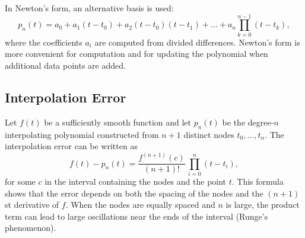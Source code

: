 \documentclass[12pt]{article}
\begin{document}
In Newton's form, an alternative basis is used:
\begin{equation}
p_n(t) =
a_0 + a_1 (t - t_0) + a_2 (t - t_0)(t - t_1) + \dots +
a_n \prod_{k=0}^{n-1} (t - t_k),
\label{eq:newton_poly}
\end{equation}
where the coefficients $a_i$ are computed from divided differences. Newton's form is more convenient for computation and for updating the
polynomial when additional data points are added.

\subsection{Interpolation Error}
Let $f(t)$ be a sufficiently smooth function and let $p_n(t)$ be the
degree-$n$ interpolating polynomial constructed from $n+1$ distinct
nodes $t_0,\dots,t_n$. The interpolation error can be written as
\begin{equation}
f(t) - p_n(t) =
\frac{f^{(n+1)}(c)}{(n+1)!}\,
\prod_{i=0}^{n} (t - t_i),
\label{eq:interp_error}
\end{equation}
for some $c$ in the interval containing the nodes and the point $t$.
This formula shows that the error depends on both the spacing of the
nodes and the $(n+1)$st derivative of $f$. When the nodes are equally
spaced and $n$ is large, the product term can lead to large oscillations
near the ends of the interval (Runge's phenomenon).
\end{document}
